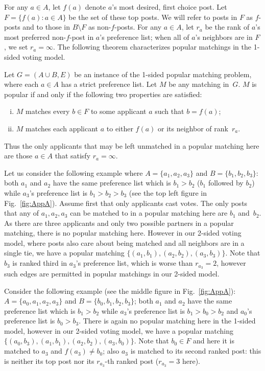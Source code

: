 \documentclass[11pt]{llncs}
\begin{document}
For any $a \in A$, let $f(a)$ denote $a$'s most desired, first choice post. Let $F = \{f(a): a \in A\}$ be the set of these top posts. We will refer to posts in $F$ as $f$-posts and to those in 
$B \setminus F$ as non-$f$-posts. For any $a \in A$, let $r_a$ be the rank of $a$'s most 
preferred non-$f$-post in $a$'s preference list; when all of $a$'s neighbors are in $F$, we 
set $r_a = \infty$. The following theorem characterizes popular matchings in the 
1-sided voting model. 
\begin{theorem}
\label{thm1}
Let $G = (A \cup B,E)$ be an instance of the 1-sided popular matching problem, where each 
$a \in A$ has a strict preference list.
Let $M$ be any matching in~$G$. $M$ is popular if and only if the following two properties are 
satisfied:
\begin{enumerate} [(i)]
\item $M$ matches every $b \in F$ to some applicant $a$ such that $b = f(a)$;
\item $M$ matches each applicant $a$ to either $f(a)$ or its neighbor of rank~$r_a$.
\end{enumerate}
\end{theorem}

Thus the only applicants that may be left unmatched in a popular matching here are those 
$a \in A$ that satisfy $r_a = \infty$.

Let us consider the following example where $A = \{a_1,a_2,a_3\}$ and $B = \{b_1,b_2,b_3\}$: 
both $a_1$ and $a_2$ have the same preference list which is $b_1 > b_2$ ($b_1$ followed by 
$b_2$) while $a_3$'s preference list is $b_1 > b_2 > b_3$ (see the top left figure in 
Fig.~\ref{fig:AppA}). Assume first that only applicants cast votes.
The only posts that any of $a_1,a_2,a_3$ can be matched to in a popular matching here 
are $b_1$ and~$b_2$.  As there are three applicants and only two possible partners 
in a popular matching, there is no popular matching here. However in our 2-sided voting model, 
where posts also care about being matched and all neighbors are in a single tie, 
we have a popular matching $\{(a_1,b_1),(a_2,b_2),(a_3,b_3)\}$. Note that $b_3$ is ranked third 
in $a_3$'s preference list, which is worse than $r_{a_3} = 2$, however such edges are permitted 
in popular matchings in our 2-sided model.

Consider the following example (see the middle figure in Fig.~\ref{fig:AppA}): $A = \{a_0,a_1,a_2,a_3\}$ 
and $B = \{b_0,b_1,b_2,b_3\}$; both $a_1$ and $a_2$ have the same preference list which is $b_1 > b_2$ 
while $a_3$'s preference list is $b_1 > b_0 > b_2$ and $a_0$'s preference list is $b_0 > b_3$. There 
is again no popular matching here in the 1-sided model, however in our 2-sided voting model, we have 
a popular matching $\{(a_0,b_3),(a_1,b_1),(a_2,b_2),(a_3,b_0)\}$. Note that $b_0 \in F$ and here it is 
matched to $a_3$ and $f(a_3) \ne b_0$; also $a_3$ is matched to its second ranked post: this 
is neither its top post nor its  $r_{a_3}$-th ranked post ($r_{a_3} = 3$ here).
\end{document}
